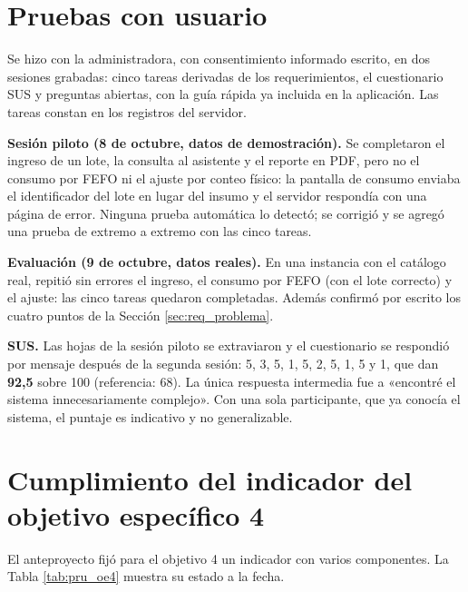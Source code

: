 \section{Pruebas con usuario}
\label{sec:pru_usuario}

Se hizo con la administradora, con consentimiento informado escrito, en dos sesiones grabadas: cinco tareas derivadas de los requerimientos, el cuestionario SUS \cite{brooke1996sus} y preguntas abiertas, con la guía rápida ya incluida en la aplicación. Las tareas constan en los registros del servidor.

\textbf{Sesión piloto (8 de octubre, datos de demostración).} Se completaron el ingreso de un lote, la consulta al asistente y el reporte en PDF, pero no el consumo por FEFO ni el ajuste por conteo físico: la pantalla de consumo enviaba el identificador del lote en lugar del insumo y el servidor respondía con una página de error. Ninguna prueba automática lo detectó; se corrigió y se agregó una prueba de extremo a extremo con las cinco tareas.

\textbf{Evaluación (9 de octubre, datos reales).} En una instancia con el catálogo real, repitió sin errores el ingreso, el consumo por FEFO (con el lote correcto) y el ajuste: las cinco tareas quedaron completadas. Además confirmó por escrito los cuatro puntos de la Sección \ref{sec:req_problema}.

\textbf{SUS.} Las hojas de la sesión piloto se extraviaron y el cuestionario se respondió por mensaje después de la segunda sesión: 5, 3, 5, 1, 5, 2, 5, 1, 5 y 1, que dan \textbf{92,5} sobre 100 (referencia: 68). La única respuesta intermedia fue a «encontré el sistema innecesariamente complejo». Con una sola participante, que ya conocía el sistema, el puntaje es indicativo y no generalizable.

\section{Cumplimiento del indicador del objetivo específico 4}
\label{sec:pru_indicador}

El anteproyecto fijó para el objetivo 4 un indicador con varios componentes. La Tabla \ref{tab:pru_oe4} muestra su estado a la fecha.

